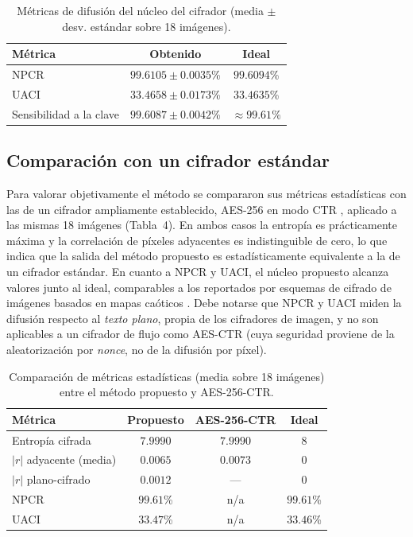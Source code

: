 \documentclass{llncs}
\begin{document}
\begin{table}[htbp]
  \centering
  \caption{M\'etricas de difusi\'on del n\'ucleo del cifrador (media
  $\pm$ desv. est\'andar sobre 18 im\'agenes).}
  \begin{tabular}{@{}lcc@{}}
    \toprule
    \textbf{M\'etrica} & \textbf{Obtenido} & \textbf{Ideal} \\
    \midrule
    NPCR                    & $99.6105 \pm 0.0035$\% & $99.6094$\% \\
    UACI                    & $33.4658 \pm 0.0173$\% & $33.4635$\% \\
    Sensibilidad a la clave & $99.6087 \pm 0.0042$\% & $\approx 99.61$\% \\
    \bottomrule
  \end{tabular}
\end{table}
\FloatBarrier

\subsection{Comparaci\'on con un cifrador est\'andar}

Para valorar objetivamente el m\'etodo se compararon sus m\'etricas
estad\'isticas con las de un cifrador ampliamente establecido, AES-256 en
modo CTR \cite{aes}, aplicado a las mismas 18 im\'agenes (Tabla~4). En
ambos casos la entrop\'ia es pr\'acticamente m\'axima y la correlaci\'on de
p\'ixeles adyacentes es indistinguible de cero, lo que indica que la salida
del m\'etodo propuesto es estad\'isticamente equivalente a la de un cifrador
est\'andar. En cuanto a NPCR y UACI, el n\'ucleo propuesto alcanza valores
junto al ideal, comparables a los reportados por esquemas de cifrado de
im\'agenes basados en mapas ca\'oticos \cite{chaos1,chaos2}. Debe notarse
que NPCR y UACI miden la difusi\'on respecto al \emph{texto plano}, propia
de los cifradores de imagen, y no son aplicables a un cifrador de flujo como
AES-CTR (cuya seguridad proviene de la aleatorizaci\'on por \emph{nonce}, no
de la difusi\'on por p\'ixel).

\begin{table}[htbp]
  \centering
  \caption{Comparaci\'on de m\'etricas estad\'isticas (media sobre 18
  im\'agenes) entre el m\'etodo propuesto y AES-256-CTR.}
  \begin{tabular}{@{}lccc@{}}
    \toprule
    \textbf{M\'etrica} & \textbf{Propuesto} & \textbf{AES-256-CTR} & \textbf{Ideal} \\
    \midrule
    Entrop\'ia cifrada         & $7.9990$  & $7.9990$  & $8$ \\
    $|r|$ adyacente (media)    & $0.0065$  & $0.0073$  & $0$ \\
    $|r|$ plano-cifrado        & $0.0012$  & ---       & $0$ \\
    NPCR                       & $99.61$\% & n/a       & $99.61$\% \\
    UACI                       & $33.47$\% & n/a       & $33.46$\% \\
    \bottomrule
  \end{tabular}
\end{table}
\FloatBarrier
\end{document}
